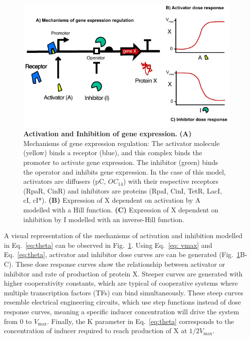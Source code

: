\begin{figure}[H] %
    \centering
    \begin{adjustbox}{center}
        \includegraphics[width=1\textwidth]{chapters/Chapter 2/activation_inhibition2} %
    \end{adjustbox}
    \caption{\textbf{Activation and Inhibition of gene expression.} \textbf{(A)} Mechanisms of gene expression regulation:
    The activator molecule (yellow) binds a receptor (blue),
        and this complex binds the promoter to activate gene expression.
    The inhibitor (green) binds the operator and inhibits gene expression.
    In the case of this model, activators are diffusers (pC, $OC_{14}$) with their respective receptors (RpaR, CinR) and inhibitors are proteins (RpaI, CinI, TetR, LacI, cI, cI*).
    \textbf{(B)} Expression of X dependent on activation by A modelled with a Hill function.
    \textbf{(C)} Expression of X dependent on inhibition by I modelled with an inverse-Hill function. }
    \label{fig:activation_inhibition} %
\end{figure}

A visual representation of the mechanisms of activation and inhibition
modelled in Eq.~\ref{eq:theta} can be observed in Fig.~\ref{fig:activation_inhibition}.
Using Eq.~\ref{eq: vmax} and Eq.~\ref{eq:theta}, activator and inhibitor dose curves are can be generated
(Fig.~\ref{fig:activation_inhibition}B-C).
These dose response curves show the relationship between activator or inhibitor and rate of production of protein X.
Steeper curves are generated with higher cooperativity constants,
which are typical of cooperative systems where multiple transcription factors (TFs) can bind simultaneously.
These steep curves resemble electrical engineering circuits,
which use step functions instead of dose response curves,
meaning a specific inducer concentration will drive the system from 0 to $V_{\max}$.
Finally,
the K parameter in Eq.~\ref{eq:theta} corresponds to the concentration of inducer
required to reach production of X at  $1/2 V_{\max}$.



